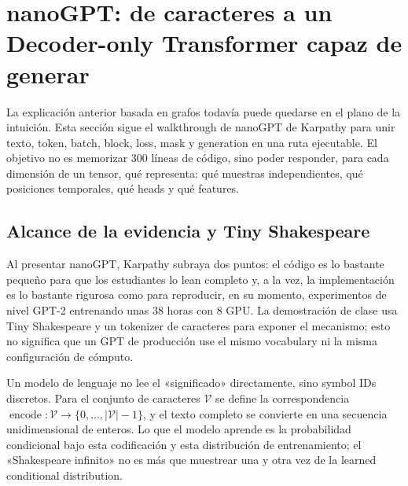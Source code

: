\section{nanoGPT: de caracteres a un Decoder-only Transformer capaz de generar}

La explicación anterior basada en grafos todavía puede quedarse en el plano de la intuición. Esta sección sigue el walkthrough de nanoGPT de Karpathy para unir texto, token, batch, block, loss, mask y generation en una ruta ejecutable. El objetivo no es memorizar 300 líneas de código, sino poder responder, para cada dimensión de un tensor, qué representa: qué muestras independientes, qué posiciones temporales, qué heads y qué features.

\subsection{Alcance de la evidencia y Tiny Shakespeare}

Al presentar nanoGPT, Karpathy subraya dos puntos: el código es lo bastante pequeño para que los estudiantes lo lean completo y, a la vez, la implementación es lo bastante rigurosa como para reproducir, en su momento, experimentos de nivel GPT-2 entrenando unas 38 horas con 8 GPU. La demostración de clase usa Tiny Shakespeare y un tokenizer de caracteres para exponer el mecanismo; esto no significa que un GPT de producción use el mismo vocabulary ni la misma configuración de cómputo.




Un modelo de lenguaje no lee el «significado» directamente, sino symbol IDs discretos. Para el conjunto de caracteres $\mathcal V$ se define la correspondencia $\operatorname{encode}:\mathcal V\to\{0,\ldots,|\mathcal V|-1\}$, y el texto completo se convierte en una secuencia unidimensional de enteros. Lo que el modelo aprende es la probabilidad condicional bajo esta codificación y esta distribución de entrenamiento; el «Shakespeare infinito» no es más que muestrear una y otra vez de la learned conditional distribution.

